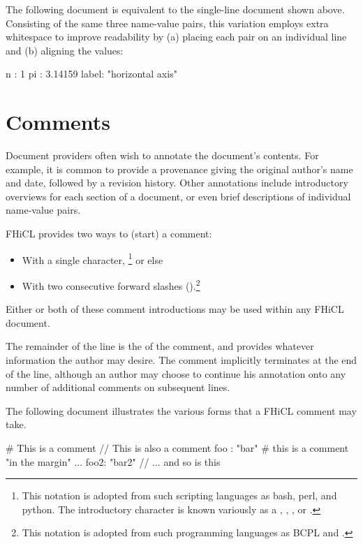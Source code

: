 \documentclass[draftmode,draftwater]{memarticle}
\newcommand{\fhicl}{FHiCL\xspace}
\begin{document}
The following document is equivalent to the single-line document shown
above.  Consisting of the same three name-value pairs, this variation
employs extra whitespace to improve readability by (a) placing each
pair on an individual line and (b) aligning the values:
%
\Needspace{0.5in}
\begin{fcllisting}[texcl,escapechar=`]
n    : 1
pi   : 3.14159
label: "horizontal axis"
\end{fcllisting}

\chapter{Comments}

Document providers often wish to annotate the document's contents.
For example, it is common to provide a provenance giving the original
author's name and date, followed by a revision history.  Other
annotations include introductory overviews for each section of a
document, or even brief descriptions of individual name-value pairs.

\fhicl provides two ways to  (start) a comment:
\begin{itemize}
\item With a single \fclcode{#} character,%
  \footnote{%
    This notation is adopted from such scripting languages as bash,
    perl, and python.  The introductory \fclcode{#} character is known
    variously as a , , ,
    or %
    .}  or else
\item With two consecutive forward slashes (\fclcode{//}).\footnote{%
    This notation is adopted from such programming languages as BCPL
    and \cpp{}%
    .}
\end{itemize}
Either or both of these comment introductions may be used within any
\fhicl document.

The remainder of the line is the  of the comment, and
provides whatever information the author may desire.  The comment
implicitly terminates at the end of the line, although an author may
choose to continue his annotation onto any number of additional
comments on subsequent lines.

The following document illustrates the various forms that a \fhicl
comment may take.
%
\Needspace{0.67in}
\begin{fcllisting}[texcl,escapechar=`]
# This is a comment
// This is also a comment
foo : "bar"   # this is a comment "in the margin" ...
foo2: "bar2" // ... and so is this
\end{fcllisting}
\end{document}
